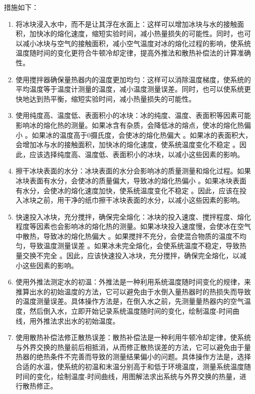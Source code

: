 \documentclass[dvipsnames, svgnames,a4paper,11pt]{article}
\begin{document}
	措施如下：
	\begin{enumerate}
		\item 将冰块浸入水中，而不是让其浮在水面上：这样可以增加冰块与水的接触面积，加快冰的熔化速度，缩短实验时间，减小热量损失的可能性。同时，也可以减小冰块与空气的接触面积，减小空气温度对冰的熔化过程的影响，使系统温度随时间的变化更符合牛顿冷却定律，提高外推法和散热补偿法的计算准确性。
		\item 使用搅拌器确保量热器内的温度更加均匀：这样可以消除温度梯度，使系统的平均温度等于温度计测量的温度，减小温度测量误差。同时，也可以使系统更快地达到热平衡，缩短实验时间，减小热量损失的可能性。
		\item 使用纯度高、温度低、表面积小的冰块：冰的纯度、温度、表面积等因素可能影响冰的熔化热的测量。如果冰含有杂质，会降低冰的熔点，使冰的熔化热偏小 。如果冰的温度高于0摄氏度，会使冰的熔化热偏大 。如果冰的表面积大，会增加冰与水的接触面积，加快冰的熔化速度，使系统温度变化不稳定 。因此，应该选择纯度高、温度低、表面积小的冰块，以减小这些因素的影响。
		\item 擦干冰块表面的水分：冰块表面的水分会影响冰的质量测量和熔化过程。如果冰块表面有水分，会使冰的质量偏大，导致冰的熔化热偏小 。如果冰块表面有水分，会使冰的熔化速度加快，使系统温度变化不稳定 。因此，应该在投入冰块之前，用干净的纸巾擦干冰块表面的水分，以减小这些因素的影响。
		\item 快速投入冰块，充分搅拌，确保完全熔化：冰块的投入速度、搅拌程度、熔化程度等因素也会影响冰的熔化热的测量。如果冰块投入速度慢，会使冰在空气中散热，导致冰的熔化热偏大 。如果搅拌不充分，会使混合物质的温度不均匀，导致温度测量误差 。如果冰未完全熔化，会使系统温度不稳定，导致热量交换不完全 。因此，应该快速投入冰块，充分搅拌，确保完全熔化，以减小这些因素的影响。
		\item 使用外推法测定水的初温：外推法是一种利用系统温度随时间变化的规律，来推算出水的初始温度的方法，它可以避免由于水倒入量热器时的热损失而导致的温度测量误差。具体操作方法是，在倒入水之前，先测量量热器内的空气温度，然后倒入水，立即开始记录系统温度随时间的变化，绘制温度-时间曲线，用外推法求出水的初始温度。
		\item 使用散热补偿法修正散热误差：散热补偿法是一种利用牛顿冷却定律，使系统与外界交换的热量前后相抵消，从而修正散热误差的方法，它可以避免由于量热器的绝热条件不完善而导致的测量结果偏小的问题。具体操作方法是，选择合适的水温，使系统的初温和末温分别高于和低于环境温度，测量系统温度随时间的变化，绘制温度-时间曲线，用图解法求出系统与外界交换的热量，进行散热修正。
	\end{enumerate}
	
	
	
\end{document}
